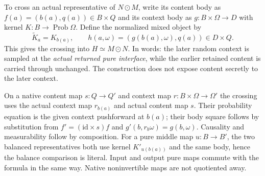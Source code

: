 \documentclass[11pt]{article}
\begin{document}
To cross an actual representative of $N\odot M$, write its content body as $f(a)=(b(a),q(a))\in B\times Q$ and its context body as $g:B\times\Omega\to D$ with kernel $K:B\to\operatorname{Prob}\Omega$. Define the normalized mixed object by
\begin{equation}\label{content:tau}
 \widetilde K_a=K_{b(a)},\qquad
 h(a,\omega)=(g(b(a),\omega),q(a))\in D\times Q.
\end{equation}
This gives the crossing into $H\simeq M\odot N$. In words: the later random context is sampled at the \emph{actual returned pure interface}, while the earlier retained content is carried through unchanged. The construction does not expose content secretly to the later context.

On a native content map $s:Q\to Q'$ and context map $r:B\times\Omega\to\Omega'$ the crossing uses the actual context map $r_{b(a)}$ and actual content map $s$. Their probability equation is the given context pushforward at $b(a)$; their body square follows by substitution from $f'=(\mathrm{id}\times s)f$ and $g'(b,r_b\omega)=g(b,\omega)$. Causality and measurability follow by composition. For a pure middle map $u:B\to B'$, the two balanced representatives both use kernel $K'_{u(b(a))}$ and the same body, hence the balance comparison is literal. Input and output pure maps commute with the formula in the same way. Native noninvertible maps are not quotiented away.
\end{document}
